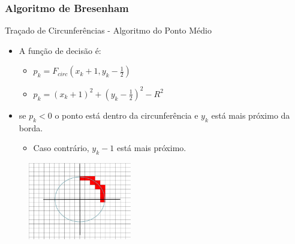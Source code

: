 \documentclass{beamer}
\begin{document}
\begin{frame}
\frametitle{Algoritmo de Bresenham}
		\begin{block}{Traçado de Circunferências - Algoritmo do Ponto Médio}
		\begin{itemize}
			\item A função de decisão é:
				\begin{itemize}
					\item $p_k = F_{circ}(x_k+1,y_k-\frac{1}{2})$
					\item $p_k = (x_k+1)^2+(y_k-\frac{1}{2})^2 - R^2$
				\end{itemize}
			\item se $p_k < 0$ o ponto está dentro da circunferência e $y_k$ está mais próximo da borda.
			\begin{itemize}
				\item Caso contrário, $y_k-1$ está mais próximo.
			\end{itemize}
		\end{itemize}
	\end{block}
	
	\begin{figure}[!h]
			\begin{center}
			\includegraphics[width=0.4\textwidth]{Figures/CirPoM}
			\end{center}
		\end{figure}	

\end{frame}
\end{document}
